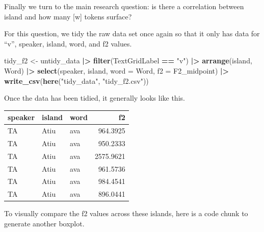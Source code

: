 \documentclass[
  ,man,floatsintext]{apa6}
\newenvironment{Shaded}{\begin{snugshade}}{\end{snugshade}}
\newcommand{\AttributeTok}[1]{\textcolor[rgb]{0.13,0.29,0.53}{#1}}
\newcommand{\FunctionTok}[1]{\textcolor[rgb]{0.13,0.29,0.53}{\textbf{#1}}}
\newcommand{\NormalTok}[1]{#1}
\newcommand{\OtherTok}[1]{\textcolor[rgb]{0.56,0.35,0.01}{#1}}
\newcommand{\SpecialCharTok}[1]{\textcolor[rgb]{0.81,0.36,0.00}{\textbf{#1}}}
\newcommand{\StringTok}[1]{\textcolor[rgb]{0.31,0.60,0.02}{#1}}
\begin{document}
Finally we turn to the main research question: is there a correlation between island and how many {[}w{]} tokens surface?

For this question, we tidy the raw data set once again so that it only has data for ``v'', speaker, island, word, and f2 values.

\begin{Shaded}
\begin{Highlighting}[]
\NormalTok{tidy\_f2 }\OtherTok{\textless{}{-}}\NormalTok{ untidy\_data }\SpecialCharTok{|\textgreater{}}
  \FunctionTok{filter}\NormalTok{(TextGridLabel }\SpecialCharTok{==} \StringTok{"v"}\NormalTok{) }\SpecialCharTok{|\textgreater{}}
  \FunctionTok{arrange}\NormalTok{(island, Word) }\SpecialCharTok{|\textgreater{}}  
  \FunctionTok{select}\NormalTok{(speaker, island, }\AttributeTok{word =}\NormalTok{ Word, }\AttributeTok{f2 =}\NormalTok{ F2\_midpoint) }\SpecialCharTok{|\textgreater{}}
  \FunctionTok{write\_csv}\NormalTok{(}\FunctionTok{here}\NormalTok{(}\StringTok{"tidy\_data"}\NormalTok{, }\StringTok{"tidy\_f2.csv"}\NormalTok{))}
\end{Highlighting}
\end{Shaded}

Once the data has been tidied, it generally looks like this.

\begin{tabular}{l|l|l|r}
\hline
speaker & island & word & f2\\
\hline
TA & Atiu & ava & 964.3925\\
\hline
TA & Atiu & ava & 950.2333\\
\hline
TA & Atiu & ava & 2575.9621\\
\hline
TA & Atiu & ava & 961.5736\\
\hline
TA & Atiu & ava & 984.4541\\
\hline
TA & Atiu & ava & 896.0441\\
\hline
\end{tabular}

To visually compare the f2 values across these islands, here is a code chunk to generate another boxplot.
\end{document}
